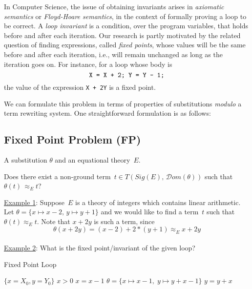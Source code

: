 \documentclass{lmcs} %
\theoremstyle{plain}\newtheorem{satz}[thm]{Satz} %
\newcommand{\dom}{\mathcal{D}om}
\begin{document}
In Computer Science, the issue of obtaining invariants arises
in \emph{axiomatic semantics} or \emph{Floyd-Hoare semantics},
in the context of formally proving a loop to be correct. A
\emph{loop invariant} is a
condition, over the program variables, 
that holds before and after each iteration. Our research
is partly motivated by the related question of
finding expressions, called \emph{fixed points}, whose values
will be the same before and after each iteration, i.e., will
remain unchanged as long as the iteration goes on. For instance,
for a loop whose body is \[ \text{\tt X = X + 2; Y = Y - 1;} \] the
value of the expression {\tt X + 2Y} is a fixed point.

We can formulate this problem in terms of properties of substitutions
\emph{modulo} a term rewriting system. One straightforward formulation
is as follows:\\

\subsection*{Fixed Point Problem (FP)}

\begin{description}[align=left]
\item[{\bf Input}] A substitution $\theta$ and an equational theory~$E$.
\item[{\bf Question}] Does there exist a non-ground term~$t \in T(Sig(E), \, {\dom}(\theta))$ 
such that~$\theta (t) \, \approx_E^{} t$?
\end{description}

\vspace{0.05in}
\noindent
\underline{Example 1}: Suppose~$E$ is a theory of integers which contains linear
arithmetic.\\ Let $\theta =\{x \mapsto x-2, \, y \mapsto y+1\}$ and we would like to find a term~$t$ such that 
$\theta (t) \approx_E^{} t$. Note that $x + 2y$ is such a term, since \[ \theta (x+2y) =
(x - 2) + 2*(y + 1) \approx_E^{} x+2y \] \\


\noindent
\underline{Example 2}: What is the fixed point/invariant of the given loop?
\begin{algorithm}
\caption{Fixed Point Loop}
	\begin{algorithmic}[1]
	    \State{} $\{x = X_0, y = Y_0\}$
	    \While{} $x > 0$
	    	\State{} $x = x -1$ \Comment \hspace{3pt} $\theta= \{x \mapsto x-1,\; y \mapsto y+x-1\}$
		\State{} $y = y + x $
	    \EndWhile
\end{algorithmic}
\end{algorithm}
\end{document}
